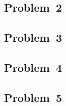 \documentclass[11pt, letterpaper]{article}
\begin{document}
\begin{solution}{2}
\subsection*{Problem~2}
\begin{question}

\end{question}

\end{solution}

\begin{solution}{3}
\subsection*{Problem~3}
\begin{question}

\end{question}

\end{solution}

\begin{solution}{4}
\subsection*{Problem~4}
\begin{question}

\end{question}

\end{solution}

\begin{solution}{5}
\subsection*{Problem~5}
\begin{question}

\end{question}

\end{solution}



\end{document}
